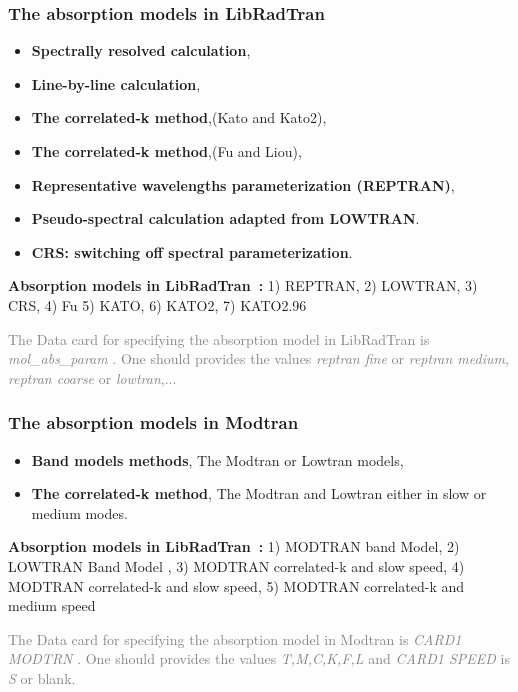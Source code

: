 \documentclass{beamer}
\begin{document}
\begin{frame}
\frametitle{The absorption models  in LibRadTran}
\begin{itemize}
\item {\bf Spectrally resolved  calculation},
\item {\bf Line-by-line calculation},
\item {\bf The correlated-k method},(Kato and Kato2),
\item {\bf The correlated-k method},(Fu and Liou),
\item {\bf Representative wavelengths parameterization (REPTRAN)},
\item {\bf Pseudo-spectral calculation adapted from LOWTRAN}. 
\item {\bf CRS: switching off spectral parameterization}. 
\end{itemize} 
\begin{block} {\bf Absorption models in LibRadTran~:} 
1) REPTRAN, 2) LOWTRAN,  3) CRS, 4) Fu 5) KATO,  6) KATO2,  7) KATO2.96 
\end{block}

\textcolor{gray}{The Data card for specifying the absorption model in LibRadTran is  \textit{mol\_abs\_param} . One should provides the values \textit{reptran fine} or  \textit{reptran medium}, \textit{reptran coarse} or \textit{lowtran},...}

\end{frame}



\begin{frame}
\frametitle{The absorption models  in Modtran}

\begin{itemize}
\item {\bf Band models methods}, The Modtran or Lowtran models,
\item {\bf The correlated-k method}, The Modtran and Lowtran either in slow or medium modes.
\end{itemize} 

\begin{block} {\bf Absorption models in LibRadTran~:} 
1) MODTRAN band Model, 2) LOWTRAN Band Model ,  3) MODTRAN correlated-k  and slow speed,  4) MODTRAN correlated-k  and slow speed, 5) MODTRAN correlated-k  and medium speed
\end{block}

\textcolor{gray}{The Data card for specifying the absorption model in Modtran is  \textit{CARD1 MODTRN } . One should provides the values \textit{T,M,C,K,F,L} and \textit{CARD1 SPEED} is \textit{S} or blank. }
\end{frame}
\end{document}
